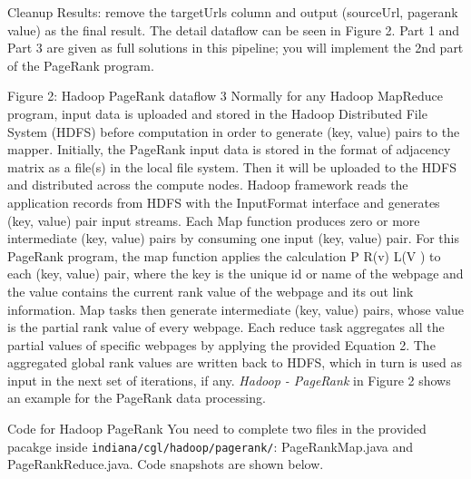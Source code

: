 \item Cleanup Results: remove the targetUrls column and output (sourceUrl, pagerank value) as the
final result.
The detail dataflow can be seen in Figure 2. Part 1 and Part 3 are given as full solutions in this pipeline;
you will implement the 2nd part of the PageRank program.

Figure 2: Hadoop PageRank dataflow
3
Normally for any Hadoop MapReduce program, input data is uploaded and stored in the Hadoop Distributed
File System (HDFS) before computation in order to generate (key, value) pairs to the mapper.
Initially, the PageRank input data is stored in the format of adjacency matrix as a file(s) in the local file
system. Then it will be uploaded to the HDFS and distributed across the compute nodes. Hadoop framework
reads the application records from HDFS with the InputFormat interface and generates (key, value) pair
input streams. Each Map function produces zero or more intermediate (key, value) pairs by consuming
one input (key, value) pair. For this PageRank program, the map function applies the calculation P R(v)
L(V )
to
each (key, value) pair, where the key is the unique id or name of the webpage and the value contains the
current rank value of the webpage and its out link information. Map tasks then generate intermediate (key,
value) pairs, whose value is the partial rank value of every webpage. Each reduce task aggregates all the
partial values of specific webpages by applying the provided Equation 2. The aggregated global rank values
are written back to HDFS, which in turn is used as input in the next set of iterations, if any. \emph{Hadoop -
PageRank} in Figure 2 shows an example for the PageRank data
processing.

Code for Hadoop PageRank
You need to complete two files in the provided pacakge inside \verb|indiana/cgl/hadoop/pagerank/|: PageRankMap.java
and PageRankReduce.java. Code snapshots are shown below.

